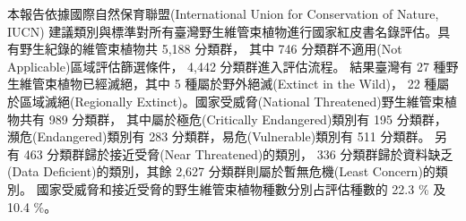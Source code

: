
本報告依據國際自然保育聯盟(International Union for Conservation of Nature, IUCN)
建議類別與標準對所有臺灣野生維管束植物進行國家紅皮書名錄評估。具有野生紀錄的維管束植物共 5,188 分類群，
其中 746 分類群不適用(Not Applicable)區域評估篩選條件， 4,442 分類群進入評估流程。
結果臺灣有 27 種野生維管束植物已經滅絕，其中 5 種屬於野外絕滅(Extinct in the Wild)，
22 種屬於區域滅絕(Regionally Extinct)。國家受威脅(National Threatened)野生維管束植物共有 989 分類群，
其中屬於極危(Critically Endangered)類別有 195 分類群，
瀕危(Endangered)類別有 283 分類群，易危(Vulnerable)類別有 511 分類群。
另有 463 分類群歸於接近受脅(Near Threatened)的類別，
336 分類群歸於資料缺乏(Data Deficient)的類別，其餘 2,627 分類群則屬於暫無危機(Least Concern)的類別。
國家受威脅和接近受脅的野生維管束植物種數分別占評估種數的 22.3 \% 及 10.4 \%。 
